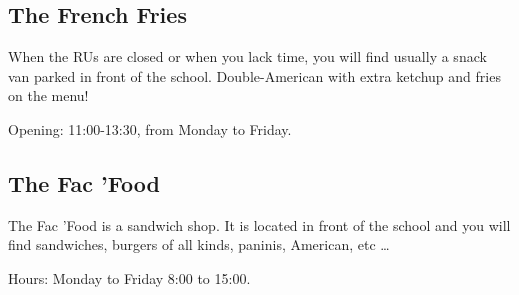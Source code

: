 
\subsection{The French Fries}
When the RUs are closed or when you lack time, you will find usually a snack van parked in front of the school.
Double-American with extra ketchup and fries on the menu!

Opening: 11:00-13:30, from Monday to Friday.




\subsection{The Fac 'Food}

The Fac 'Food is a sandwich shop. It is located in front of the school and you will find sandwiches, burgers of all kinds, paninis, American, etc \dots

Hours: Monday to Friday 8:00 to 15:00.






